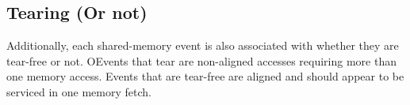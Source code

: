 
    \subsection{Tearing (Or not)}
        Additionally, each shared-memory event is also associated with whether they are tear-free or not. OEvents that tear are non-aligned accesses requiring more than one memory access. Events that are tear-free are aligned and should appear to be serviced in one memory fetch\footnotemark.
     
                       